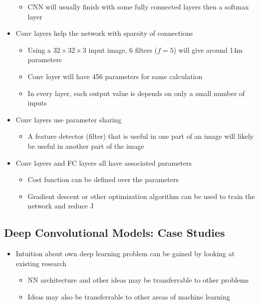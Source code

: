 \documentclass[12pt, letterpaper]{article}
\begin{document}
\begin{itemize}
\begin{itemize}
            \item CNN will usually finish with some fully connected layers then a softmax layer
        \end{itemize}
        \item Conv layers help the network with sparsity of connections
        \begin{itemize}
            \item Using a $32\times 32\times 3$ input image, 6 filters ($f=5$) will give around 14m parameters 
            \item Conv layer will have 456 parameters for same calculation
            \item In every layer, each output value is depends on only a small number of inputs
        \end{itemize}
        \item Conv layers use parameter sharing
        \begin{itemize}
            \item A feature detector (filter) that is useful in one part of an image will likely be useful in another part of the image
        \end{itemize}
        \item Conv layers and FC layers all have associated parameters
        \begin{itemize}
            \item Cost function can be defined over the parameters
            \item Gradient descent or other optimization algorithm can be used to train the network and reduce J
        \end{itemize}
    \end{itemize}
    \subsection{Deep Convolutional Models: Case Studies}
    \begin{itemize}
        \item Intuition about own deep learning problem can be gained by looking at existing research
        \begin{itemize}
            \item NN architecture and other ideas may be transferrable to other problems
            \item Ideas may also be transferrable to other areas of machine learning
        \end{itemize}
    \end{itemize}
\end{document}
